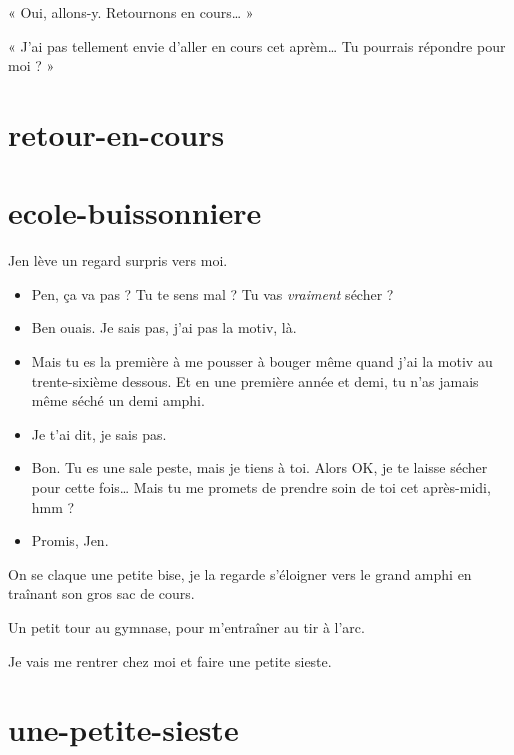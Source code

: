 \item « Oui, allons-y. Retournons en cours… » 
\item « J'ai pas tellement envie d'aller en cours cet aprèm… Tu pourrais répondre pour moi ? » 
\enw

\section{retour-en-cours}



\section{ecole-buissonniere}

Jen lève un regard surpris vers moi.

\begin{itemize}
\item Pen, ça va pas ? Tu te sens mal ? Tu vas \textit{vraiment} sécher ?
\item Ben ouais. Je sais pas, j'ai pas la motiv, là.
\item Mais tu es la première à me pousser à bouger même quand j'ai la motiv au trente-sixième dessous. Et en une première année et demi, tu n'as jamais même séché un demi amphi.
\item Je t'ai dit, je sais pas.
\item Bon. Tu es une sale peste, mais je tiens à toi. Alors OK, je te laisse sécher pour cette fois… Mais tu me promets de prendre soin de toi cet après-midi, hmm ?
\item Promis, Jen.
\end{itemize}

On se claque une petite bise, je la regarde s'éloigner vers le grand amphi en traînant son gros sac de cours.

\item Un petit tour au gymnase, pour m'entraîner au tir à l'arc. 
\item Je vais me rentrer chez moi et faire une petite sieste. 
\enw

\section{une-petite-sieste}


